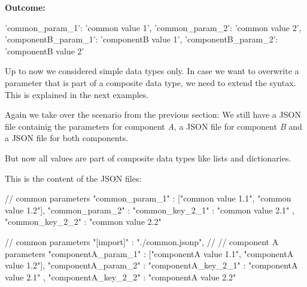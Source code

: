 \vspace{2ex}

\textbf{Outcome:}

\vspace{2ex}

\begin{pythonlog}
{'common_param_1': 'common value 1',
 'common_param_2': 'common value 2',
 'componentB_param_1': 'componentB value 1',
 'componentB_param_2': 'componentB value 2'}
\end{pythonlog}

\vspace{2ex}

Up to now we considered simple data types only. In case we want to overwrite a parameter that is part of a composite data type, we need to extend the syntax.
This is explained in the next examples.

\vspace{2ex}

Again we take over the scenario from the previous section: We still have a JSON file  containig the parameters for
component \textit{A}, a JSON file  for component \textit{B} and a JSON file  for both components.

But now all values are part of composite data types like lists and dictionaries.

This is the content of the JSON files:

\vspace{2ex}

\textbullet {}

\begin{pythoncode}
{
   // common parameters
   "common_param_1" : ["common value 1.1", "common value 1.2"],
   "common_param_2" : {"common_key_2_1" : "common value 2.1" ,
                       "common_key_2_2" : "common value 2.2"}
}
\end{pythoncode}

\textbullet {}

\begin{pythoncode}
{
   // common parameters
   "[import]" : "./common.jsonp",
   //
   // component A parameters
   "componentA_param_1" : ["componentA value 1.1", "componentA value 1.2"],
   "componentA_param_2" : {"componentA_key_2_1" : "componentA value 2.1" ,
                           "componentA_key_2_2" : "componentA value 2.2"}
}
\end{pythoncode}

